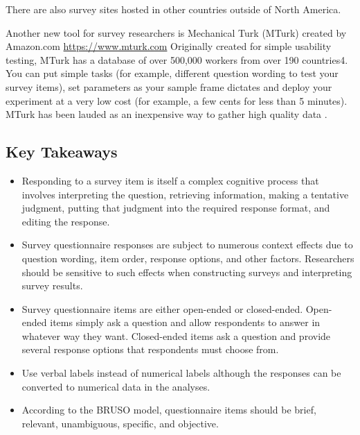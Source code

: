 There are also survey sites hosted in other countries outside of North America.

Another new tool for survey researchers is Mechanical Turk (MTurk) created by Amazon.com
\url{https://www.mturk.com} Originally created for simple usability testing, MTurk has a database of over 500,000 workers from over 190 countries4. You can put simple tasks (for example, different question wording to test your survey items), set parameters as your sample frame dictates and deploy your experiment at a very low cost (for example, a few cents for less than 5 minutes). MTurk has been lauded as an inexpensive way to gather high quality data \citep{buhrmester_amazons_2011}.


\subsection{Key Takeaways}

\begin{fullwidth}

\begin{itemize}


\item Responding to a survey item is itself a complex cognitive process that involves interpreting the question, retrieving information, making a tentative judgment, putting that judgment into the required response format, and editing the response.

\item Survey questionnaire responses are subject to numerous context effects due to question wording, item order, response options, and other factors. Researchers should be sensitive to such effects when constructing surveys and interpreting survey results.

\item Survey questionnaire items are either open-ended or closed-ended. Open-ended items simply ask a question and allow respondents to answer in whatever way they want. Closed-ended items ask a question and provide several response options that respondents must choose from.

\item Use verbal labels instead of numerical labels although the responses can be converted to numerical data in the analyses.

\item According to the BRUSO model, questionnaire items should be brief, relevant, unambiguous, specific, and objective.


\end{itemize}

\end{fullwidth}



